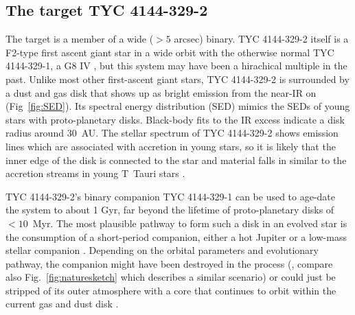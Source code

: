 \documentclass[letterpaper,11pt]{article}
\begin{document}
 

\subsection*{The target TYC 4144-329-2}

\vskip -0.1in
The target is a member of a wide ($> 5$ arcsec) binary. TYC 4144-329-2 itself is a F2-type first ascent giant star in a wide orbit with the otherwise normal  TYC 4144-329-1, a G8 IV \cite{2009ApJ...696.1964M}, but this system may have been a hirachical multiple in the past. Unlike most other first-ascent giant stars, TYC 4144-329-2 is surrounded by a dust and gas disk that shows up as bright emission from the near-IR on (Fig~\ref{fig:SED}). Its spectral energy distribution (SED) mimics the SEDs of young stars with proto-planetary disks. 
Black-body fits to the IR excess indicate a disk radius around 30~AU. The stellar spectrum of TYC 4144-329-2 shows emission lines which are associated with accretion in young stars, so it is likely that the inner edge of the disk is connected to the star and material falls in similar to the accretion streams in young T~Tauri stars \cite{2009ApJ...696.1964M}. 

TYC 4144-329-2's binary companion TYC 4144-329-1 can be used to age-date the system \cite{2009ApJ...696.1964M} to about 1 Gyr, far beyond the lifetime of proto-planetary disks of $<10$~Myr. The most plausible pathway to form such a disk in an evolved star is the consumption of a short-period companion, either a hot Jupiter or a low-mass stellar companion \cite{2009ApJ...696.1964M}. Depending on the orbital parameters and evolutionary pathway, the companion might have been destroyed in the process (\cite{2003ApJ...582.1032J}, compare also Fig.~\ref{fig:naturesketch} which describes a similar scenario) or could just be stripped of its outer atmosphere with a core that continues to orbit within the current gas and dust disk \cite{2003ASPC..293...76W}.
\end{document}
